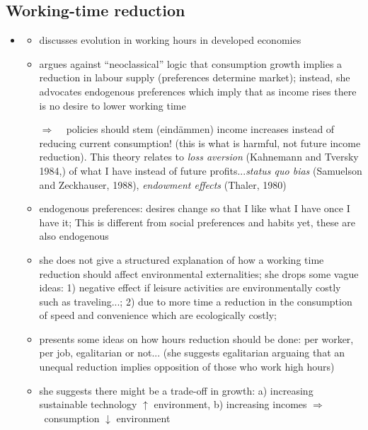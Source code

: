 \documentclass[12pt]{article}
\newcommand{\ar}{$\Rightarrow$ \ }
\begin{document}
\subsection{Working-time reduction}
\begin{itemize}
\item \cite{Schor2005SustainableReduction}
\begin{itemize}
\item discusses evolution in working hours in developed economies
\item argues against ``neoclassical'' logic that consumption growth implies a reduction in labour supply (preferences determine market); instead, she advocates endogenous preferences which imply that as income rises there is no desire to lower working time 
\item[\ar] policies should stem (eindämmen) income increases instead of reducing current consumption! (this is what is harmful, not future income reduction). This theory relates to \textit{loss aversion} (Kahnemann and Tversky 1984,) of what I have instead of future profits...\textit{status quo bias} (Samuelson and Zeckhauser, 1988), \textit{endowment effects} (Thaler, 1980)
\item endogenous preferences: desires change so that I like what I have once I have it; This is different from social preferences and habits yet, these are also endogenous  
\item she does not give a structured explanation of how a working time reduction should affect environmental externalities; she drops some vague ideas: 1) negative effect if leisure activities are environmentally costly such as traveling...; 2) due to more time a reduction in the consumption of speed and convenience which are ecologically costly;
\item presents some ideas on how hours reduction should be done: per worker, per job, egalitarian or not... (she suggests egalitarian arguaing that an unequal reduction implies opposition of those who work high hours)
\item she suggests there might be a trade-off in growth: a) increasing sustainable technology $\uparrow$ environment, b) increasing incomes \ar consumption $\downarrow$ environment
\end{itemize}


\end{itemize}
\end{document}
